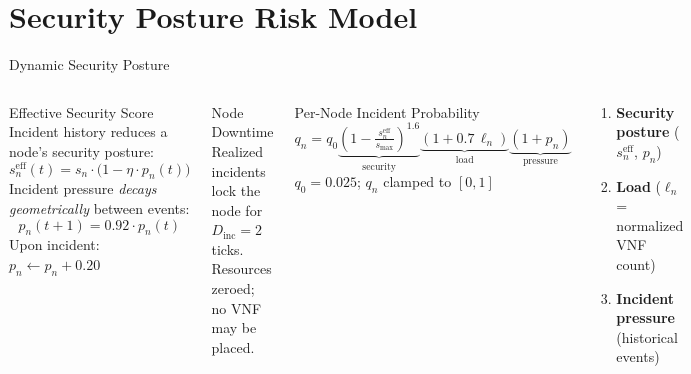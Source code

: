 \section{Security Posture Risk Model}

\begin{frame}{Dynamic Security Posture}
  \begin{columns}[T]
      \begin{block}{Effective Security Score}
        Incident history reduces a node's security posture:
        \[s_n^{\text{eff}}(t) = s_n \cdot \bigl(1 - \eta \cdot p_n(t)\bigr)\]
        Incident pressure \emph{decays geometrically} between events:
        \[p_n(t+1) = 0.92 \cdot p_n(t)\]
        Upon incident: $p_n \leftarrow p_n + 0.20$
      \end{block}
      \vspace{4pt}
      \begin{alertblock}{Node Downtime}
        Realized incidents lock the node for $D_{\text{inc}}=2$ ticks. Resources zeroed; no VNF may be placed.
      \end{alertblock}
      \begin{block}{Per-Node Incident Probability}
        \[q_n = q_0\underbrace{\!\left(1-\tfrac{s_n^{\text{eff}}}{s_{\max}}\right)^{\!1.6}}_{\text{security}}\underbrace{(1+0.7\,\ell_n)}_{\text{load}}\underbrace{(1+p_n)}_{\text{pressure}}\]
        $q_0=0.025$; $q_n$ clamped to $[0,1]$
      \end{block}
      \vspace{4pt}
      \begin{tcolorbox}[colback=lightgray, colframe=cuired, title=Three Risk Drivers, fonttitle=\small\bfseries]
        \footnotesize
        \begin{enumerate}
          \item \textbf{Security posture} ($s_n^{\text{eff}}$, $p_n$)
          \item \textbf{Load} ($\ell_n$ = normalized VNF count)
          \item \textbf{Incident pressure} (historical events)
        \end{enumerate}
      \end{tcolorbox}
  \end{columns}
\end{frame}

